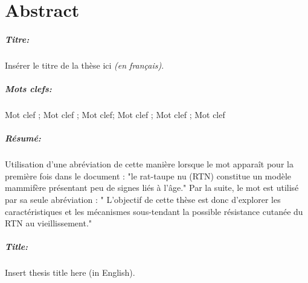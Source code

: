 \chapter*{Abstract}

\vspace{-.25cm}
\paragraph*{Titre:} Insérer le titre de la thèse ici \textit{(en français)}.

\begin{small}
\vspace{-.25cm}
\paragraph*{Mots clefs:} Mot clef ; Mot clef ; Mot clef; Mot clef ;  Mot clef ; Mot clef

\vspace{-.25cm}
\setlength{\columnsep}{12pt} %
\begin{multicols}{2}
\paragraph*{Résumé:} 
Utilisation d'une abréviation de cette manière lorsque le mot apparaît pour la première fois dans le document : "le rat-taupe nu (\acrshort{RTN}) constitue un modèle mammifère présentant peu de signes liés à l’âge." 
Par la suite, le mot est utilisé par sa seule abréviation : " L'objectif de cette thèse est donc d'explorer les caractéristiques et les mécanismes sous-tendant la possible résistance cutanée du \acrshort{RTN} au vieillissement."

\lipsum[1-4]


\end{multicols}
\end{small}

\clearpage 

\vspace{-.25cm}
\paragraph*{Title:} Insert thesis title here (in English).

